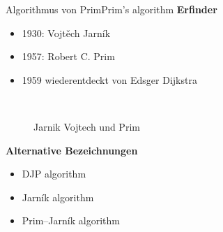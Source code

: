 \begin{frame}{Algorithmus von Prim}{Prim's algorithm}
	\textbf{Erfinder}
	\begin{itemize}
		\item 1930: Vojtěch Jarník
		\item 1957: Robert C. Prim
		\item 1959 wiederentdeckt von Edsger Dijkstra
	\end{itemize}

	\begin{figure}
\centering
\mbox{\quad
{}}
\caption{Jarnik Vojtech und Prim}
\end{figure}
	\textbf{Alternative Bezeichnungen}
	\begin{itemize}
		\item DJP algorithm
		\item Jarník algorithm
		\item Prim–Jarník algorithm
	\end{itemize}

\end{frame}
